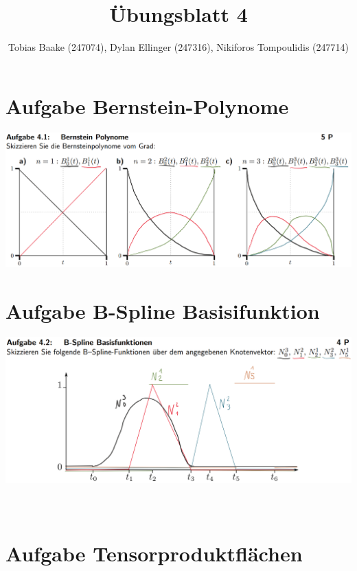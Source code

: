 \documentclass{article}
\title{Übungsblatt 4}
\author{Tobias Baake (247074), Dylan Ellinger (247316), Nikiforos Tompoulidis (247714)}
\begin{document}
\maketitle

\section{Aufgabe Bernstein-Polynome}
\includegraphics[width=400pt]{./files/Übung4.1.png}

\section{Aufgabe B-Spline Basisifunktion}
\includegraphics[width=400pt]{./files/Übung4.2.png}
\\
\\
\\
\section{Aufgabe Tensorproduktflächen}
\end{document}
